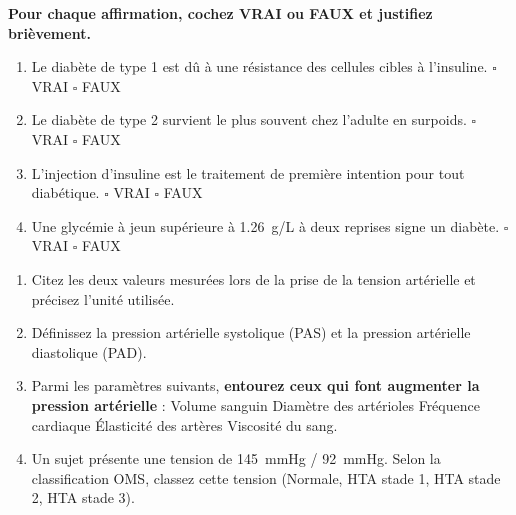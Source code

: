 \documentclass[11pt]{article}
\begin{document}
\begin{exercice}
\textbf{Pour chaque affirmation, cochez VRAI ou FAUX et justifiez brièvement.}
\begin{enumerate}
\item Le diabète de type 1 est dû à une résistance des cellules cibles à l'insuline. \hfill $\square$ VRAI \quad $\square$ FAUX
\item Le diabète de type 2 survient le plus souvent chez l'adulte en surpoids. \hfill $\square$ VRAI \quad $\square$ FAUX
\item L'injection d'insuline est le traitement de première intention pour tout diabétique. \hfill $\square$ VRAI \quad $\square$ FAUX
\item Une glycémie à jeun supérieure à \SI{1,26}{g/L} à deux reprises signe un diabète. \hfill $\square$ VRAI \quad $\square$ FAUX
\end{enumerate}
\end{exercice}

\begin{exercice}
\begin{enumerate}
\item Citez les deux valeurs mesurées lors de la prise de la tension artérielle et précisez l'unité utilisée.
\item Définissez la pression artérielle systolique (PAS) et la pression artérielle diastolique (PAD).
\item Parmi les paramètres suivants, \textbf{entourez ceux qui font augmenter la pression artérielle} : 
Volume sanguin \quad Diamètre des artérioles \quad Fréquence cardiaque \quad Élasticité des artères \quad Viscosité du sang.
\item Un sujet présente une tension de \SI{145}{mmHg} / \SI{92}{mmHg}. Selon la classification OMS, classez cette tension (Normale, HTA stade 1, HTA stade 2, HTA stade 3).
\end{enumerate}
\end{exercice}
\end{document}
